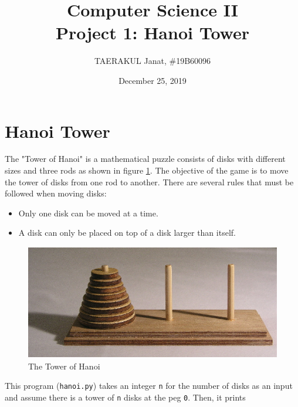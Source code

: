 \documentclass[12pt]{article}
\title{Computer Science II \\Project 1: Hanoi Tower}
\author{TAERAKUL Janat, \#19B60096}
\date{December 25, 2019}
\begin{document}

\maketitle

\section{Hanoi Tower}\label{sec:instr}

	The "Tower of Hanoi" is a mathematical puzzle consists of disks with different sizes and three rods as shown in figure \ref{fig:hanoi}. The objective of the game is to move the tower of disks from one rod to another. There are several rules that must be followed when moving disks:
	\begin{itemize}
	    \item Only one disk can be moved at a time.
	    \item A disk can only be placed on top of a disk larger than itself.
	\end{itemize}

	\begin{figure}[ht]
		\centering
		\includegraphics[height=5cm]{Hanoi.jpeg}
		\caption{The Tower of Hanoi}
		\label{fig:hanoi}
	\end{figure}

	This program (\texttt{hanoi.py}) takes an integer \texttt{n} for the number of disks as an input and assume there is a tower of \texttt{n} disks at the peg \texttt{0}. Then, it prints  
	
\end{document}
